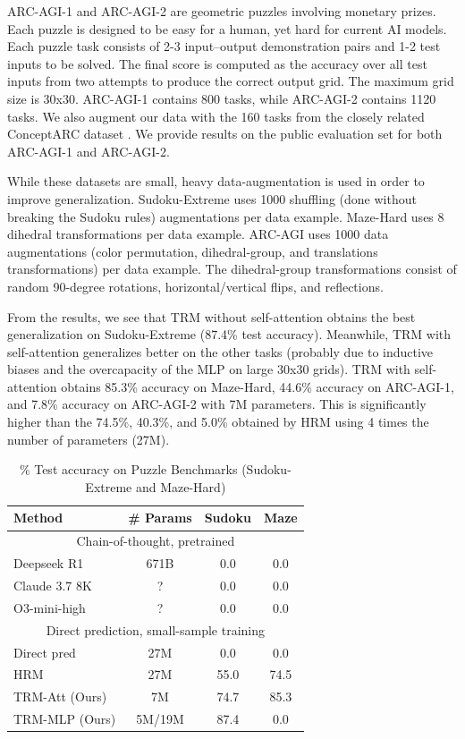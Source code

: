 \documentclass{article}
\newcounter{col}
\newcommand{\highlightgreen}[1]{\colorbox{green!15}{#1}}
\theoremstyle{plain}
\theoremstyle{definition}
\theoremstyle{remark}
\begin{document}
ARC-AGI-1 and ARC-AGI-2 are geometric puzzles involving monetary prizes. Each puzzle is designed to be easy for a human, yet hard for current AI models. Each puzzle task consists of 2-3 input–output demonstration pairs and 1-2 test inputs to be solved. The final score is computed as the accuracy over all test inputs from two attempts to produce the correct output grid. The maximum grid size is 30x30. ARC-AGI-1 contains 800 tasks, while ARC-AGI-2 contains 1120 tasks. We also augment our data with the 160 tasks from the closely related ConceptARC dataset \citep{moskvichev2023conceptarc}. We provide results on the public evaluation set for both ARC-AGI-1 and ARC-AGI-2. 

While these datasets are small, heavy data-augmentation is used in order to improve generalization. Sudoku-Extreme uses 1000 shuffling (done without breaking the Sudoku rules) augmentations per data example. Maze-Hard uses 8 dihedral transformations per data example. ARC-AGI uses 1000 data augmentations (color permutation, dihedral-group, and translations transformations) per data example. The dihedral-group transformations consist of random 90-degree rotations, horizontal/vertical flips, and reflections.

From the results, we see that TRM without self-attention obtains the best generalization on Sudoku-Extreme (87.4\% test accuracy). Meanwhile, TRM with self-attention generalizes better on the other tasks (probably due to inductive biases and the overcapacity of the MLP on large 30x30 grids). TRM with self-attention obtains 85.3\% accuracy on Maze-Hard, 44.6\% accuracy on ARC-AGI-1, and 7.8\% accuracy on ARC-AGI-2 with 7M parameters. This is significantly higher than the 74.5\%, 40.3\%, and 5.0\% obtained by HRM using 4 times the number of parameters (27M).

\setlength{\tabcolsep}{4pt} %
\begin{table}[ht]
\caption{\% Test accuracy on Puzzle Benchmarks (Sudoku-Extreme and Maze-Hard)}
\centering
\begin{tabular}{|l|c|c|c|}
\hline
 Method & \# Params & Sudoku & Maze \\
\hline
\multicolumn{4}{|c|}{Chain-of-thought, pretrained} \\
\hline
Deepseek R1 & 671B & 0.0 & 0.0 \\
Claude 3.7 8K & ? & 0.0 & 0.0 \\
O3-mini-high & ? & 0.0 & 0.0 \\
\hline
\multicolumn{4}{|c|}{Direct prediction, small-sample training} \\
\hline
Direct pred & 27M & 0.0 & 0.0 \\
HRM & 27M & 55.0 & 74.5 \\
\hdashline
TRM-Att (Ours) & 7M & 74.7 & \highlightgreen{85.3} \\
TRM-MLP (Ours) & 5M/19M\footnotemark & \highlightgreen{87.4} & 0.0 \\
\hline
\end{tabular}
\label{tab:puzzle}
\end{table}
\setlength{\tabcolsep}{6pt} %
\end{document}
